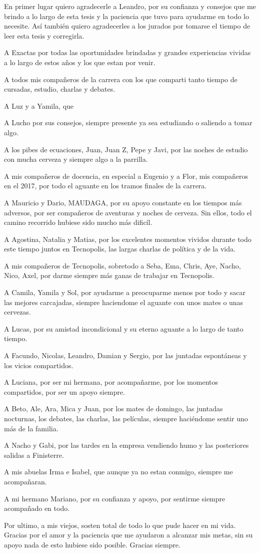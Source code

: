 \setlength\parindent{1cm}
En primer lugar quiero agradecerle a Leandro, por su confianza y consejos que me brindo a lo largo de esta tesis y la paciencia que tuvo para ayudarme en todo lo necesite. Así también quiero agradecerles a los jurados por tomarse el tiempo de leer esta tesis y corregirla.

A Exactas por todas las oportunidades brindadas y grandes experiencias vividas a lo largo de estos años y los que estan por venir.

A todos mis compañeros de la carrera con los que comparti tanto tiempo de cursadas, estudio, charlas y debates.

A Luz y a Yamila, que 

A Lucho por sus consejos, siempre presente ya sea estudiando o saliendo a tomar algo.

A los pibes de ecuaciones, Juan, Juan Z, Pepe y Javi, por las noches de estudio con mucha cerveza y siempre algo a la parrilla.

A mis compañeros de docencia, en especial a Eugenio y a Flor, mis compañeros en el 2017, por todo el aguante en los tramos finales de la carrera.

A Mauricio y Dario, MAUDAGA, por su apoyo constante en los tiempos más adversos, por ser compañeros de aventuras y noches de cerveza. Sin ellos, todo el camino recorrido hubiese sido mucho más dificíl.

A Agostina, Natalia y Matias, por los excelentes momentos vividos durante todo este tiempo juntos en Tecnopolis, las largas charlas de política y de la vida.

A mis compañeros de Tecnopolis, sobretodo a Seba, Ema, Chris, Aye, Nacho, Nico, Axel, por darme siempre más ganas de trabajar en Tecnopolis.

A Camila, Yamila y Sol, por ayudarme a preocuparme menos por todo y sacar las mejores carcajadas, siempre haciendome el aguante con unos mates o unas cervezas.

A Lucas, por su amistad incondicional y su eterno aguante a lo largo de tanto tiempo.

A Facundo, Nicolas, Leandro, Damian y Sergio, por las juntadas espontáneas y los vicios compartidos.

A Luciana, por ser mi hermana, por acompañarme, por los momentos compartidos, por ser un apoyo siempre.

A Beto, Ale, Ara, Mica y Juan, por los mates de domingo, las juntadas nocturnas, los debates, las charlas, las películas, siempre haciéndome sentir uno más de la familia. 

A Nacho y Gabi, por las tardes en la empresa vendiendo humo y las posteriores salidas a Finisterre.

A mis abuelas Irma e Isabel, que aunque ya no estan conmigo, siempre me acompañaran.

A mi hermano Mariano, por su confianza y apoyo, por sentirme siempre acompañado en todo.

Por ultimo, a mis viejos, sosten total de todo lo que pude hacer en mi vida. Gracias por el amor y la paciencia que me ayudaron a alcanzar mis metas, sin su apoyo nada de esto hubiese sido posible. Gracias siempre.


